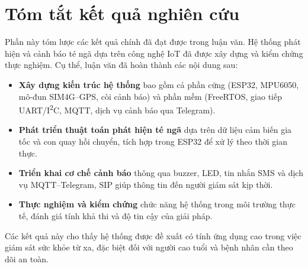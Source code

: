 \section{Tóm tắt kết quả nghiên cứu}
\label{sec:summary}

Phần này tóm lược các kết quả chính đã đạt được trong luận văn. 
Hệ thống phát hiện và cảnh báo té ngã dựa trên công nghệ IoT đã được xây dựng và kiểm chứng thực nghiệm. 
Cụ thể, luận văn đã hoàn thành các nội dung sau: 

\begin{itemize}
    \item \textbf{Xây dựng kiến trúc hệ thống} bao gồm cả phần cứng (ESP32, MPU6050, mô-đun SIM4G--GPS, còi cảnh báo) và phần mềm (FreeRTOS, giao tiếp UART/I\textsuperscript{2}C, MQTT, dịch vụ cảnh báo qua Telegram).
    \item \textbf{Phát triển thuật toán phát hiện té ngã} dựa trên dữ liệu cảm biến gia tốc và con quay hồi chuyển, tích hợp trong ESP32 để xử lý theo thời gian thực.
    \item \textbf{Triển khai cơ chế cảnh báo} thông qua buzzer, LED, tin nhắn SMS và dịch vụ MQTT--Telegram, SIP giúp thông tin đến người giám sát kịp thời.
    \item \textbf{Thực nghiệm và kiểm chứng} chức năng hệ thống trong môi trường thực tế, đánh giá tính khả thi và độ tin cậy của giải pháp.
\end{itemize}

Các kết quả này cho thấy hệ thống được đề xuất có tính ứng dụng cao trong việc giám sát sức khỏe từ xa, đặc biệt đối với người cao tuổi và bệnh nhân cần theo dõi an toàn.

